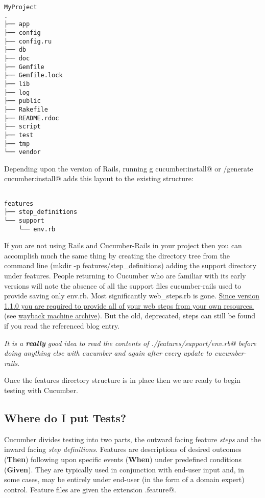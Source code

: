 \begin{verbatim}
MyProject
.
├── app
├── config
├── config.ru
├── db
├── doc
├── Gemfile
├── Gemfile.lock
├── lib
├── log
├── public
├── Rakefile
├── README.rdoc
├── script
├── test
├── tmp
└── vendor

\end{verbatim}
Depending upon the version of Rails, running \verb@rails g cucumber:install@ or \verb@script/generate cucumber:install@ adds this layout to the existing structure:
\begin{verbatim}

features
├── step_definitions
└── support
    └── env.rb

\end{verbatim}
If you are not using Rails and Cucumber-Rails in your project then you can accomplish much the same thing by creating the directory tree from the command line (mkdir -p features/step\_definitions) adding the support directory under features.  People returning to Cucumber who are familiar with its early versions will note the absence of all the support files cucumber-rails used to provide saving only env.rb.  Most significantly web\_steps.rb is gone.  \href{http://aslakhellesoy.com/post/11055981222/the-training-wheels-came-off}{Since version 1.1.0 you are required to provide all of your web steps from your own resources.} (see \href{http://web.archive.org/web/20130424133851/http://aslakhellesoy.com/post/11055981222/the-training-wheels-came-off}{wayback machine archive}).  But the old, deprecated, steps can still be found if you read the referenced blog entry.

\emph{ It is a \textbf{really} good idea to read the contents of \verb@./features/support/env.rb@ before doing anything else with cucumber and again after every update to cucumber-rails.}

Once the features directory structure is in place then we are ready to begin testing with Cucumber.

\subsection{Where do I put Tests?}

Cucumber divides testing into two parts, the outward facing feature \emph{steps} and the inward facing \emph{step definitions}.  Features are descriptions of desired outcomes (\textbf{Then}) following upon specific events (\textbf{When}) under predefined conditions (\textbf{Given}).  They are typically used in conjunction with end-user input and, in some cases, may be entirely under end-user (in the form of a domain expert) control. Feature files are given the extension \verb@.feature@.


